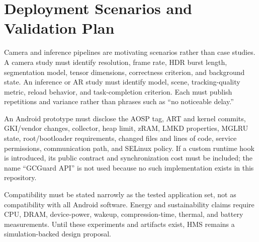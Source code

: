 \section{Deployment Scenarios and Validation Plan}
\label{sec_case}
Camera and inference pipelines are motivating scenarios rather than case studies.
A camera study must identify resolution, frame rate, HDR burst length, segmentation
model, tensor dimensions, correctness criterion, and background state.  An
inference or AR study must identify model, scene, tracking-quality metric, reload
behavior, and task-completion criterion.  Each must publish repetitions and
variance rather than phrases such as ``no noticeable delay.''

An Android prototype must disclose the AOSP tag, ART and kernel commits, GKI/vendor
changes, collector, heap limit, zRAM, LMKD properties, MGLRU state, root/bootloader
requirements, changed files and lines of code, service permissions, communication
path, and SELinux policy.  If a custom runtime hook is introduced, its public
contract and synchronization cost must be included; the name ``GCGuard API'' is
not used because no such implementation exists in this repository.

Compatibility must be stated narrowly as the tested application set, not as
compatibility with all Android software.  Energy and sustainability claims require
CPU, DRAM, device-power, wakeup, compression-time, thermal, and battery
measurements.  Until these experiments and artifacts exist, HMS remains a
simulation-backed design proposal.

